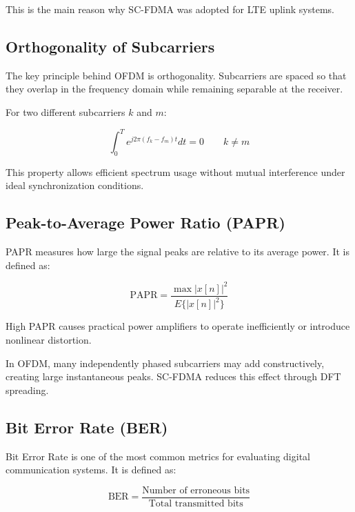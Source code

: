 This is the main reason why SC-FDMA was adopted for LTE uplink systems.

\subsection{Orthogonality of Subcarriers}

The key principle behind OFDM is orthogonality. Subcarriers are spaced so
that they overlap in the frequency domain while remaining separable at the
receiver.

For two different subcarriers $k$ and $m$:

\begin{equation}
\int_{0}^{T}
e^{j2\pi(f_k-f_m)t}dt = 0
\qquad k \neq m
\end{equation}

This property allows efficient spectrum usage without mutual interference
under ideal synchronization conditions.

\subsection{Peak-to-Average Power Ratio (PAPR)}

PAPR measures how large the signal peaks are relative to its average
power. It is defined as:

\begin{equation}
\mathrm{PAPR}
=
\frac{\max |x[n]|^2}{E\{|x[n]|^2\}}
\end{equation}

High PAPR causes practical power amplifiers to operate inefficiently or
introduce nonlinear distortion.

In OFDM, many independently phased subcarriers may add constructively,
creating large instantaneous peaks. SC-FDMA reduces this effect through
DFT spreading.

\subsection{Bit Error Rate (BER)}

Bit Error Rate is one of the most common metrics for evaluating digital
communication systems. It is defined as:

\begin{equation}
\mathrm{BER}
=
\frac{\text{Number of erroneous bits}}
{\text{Total transmitted bits}}
\end{equation}


